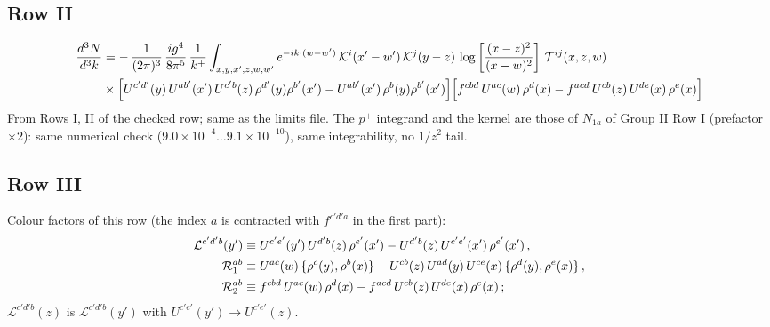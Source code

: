 \documentclass[9pt]{article}
\numberwithin{equation}{section}
\begin{document}
\subsection{Row II}
\begin{align}
     \frac{d^{3}N}{d^{3}k}  & =  -\,\frac{1}{(2\pi)^{3}}\,\frac{ig^{4}}{8\pi^{5}}\,\frac{1}{k^{+}} \int_{x,y,x',z,w,w^{\prime}} e^{-ik\cdot(w-w^{\prime})}\,\mathcal{K}^{i}(x'-w')\,\mathcal{K}^{j}(y-z)\,\log\left[\frac{(x-z)^{2}}{(x-w)^{2}}\right]\,\mathcal{T}^{ij}(x,z,w)\notag \\
& \times \Big[U^{c'd'}(y)\,U^{ab'}(x')\,U^{c'b}(z)\,\rho^{d'}(y)\rho^{b'}(x')-U^{ab'}(x')\,\rho^{b}(y)\rho^{b'}(x')\Big]\Big[f^{cbd}\,U^{ac}(w)\,\rho^{d}(x)-f^{acd}\, U^{cb}(z)\,U^{de}(x)\,\rho^{e}(x)\Big]
\end{align}
{\color{gray}\small From Rows I, II of the checked row; same as the limits file. The $p^{+}$ integrand and the kernel are those of $N_{1a}$ of Group II Row I (prefactor $\times2$): same numerical check ($9.0\times10^{-4}\dots9.1\times10^{-10}$), same integrability, no $1/z^{2}$ tail.}
\subsection{Row III}
\noindent Colour factors of this row (the index $a$ is contracted with $f^{c'd'a}$ in the first part):
\begin{align}
\mathcal{L}^{c'd'b}(y') & \equiv U^{c'e'}(y')\,U^{d'b}(z)\,\rho^{e'}(x')-U^{d'b}(z)\,U^{c'e'}(x')\,\rho^{e'}(x')\,,\notag\\
\mathcal{R}_{1}^{ab} & \equiv U^{ac}(w)\, \{\rho^{c}(y),\rho^{b}(x)\}-U^{cb}(z)\,U^{ad}(y)\,U^{ce}(x)\,\{\rho^{d}(y),\rho^{e}(x)\}\,,\notag\\
\mathcal{R}_{2}^{ab} & \equiv f^{cbd}\,U^{ac}(w)\,\rho^{d}(x) -f^{acd}\,U^{cb}(z)\,U^{de}(x)\,\rho^{e}(x)\,;\notag
\end{align}
$\mathcal{L}^{c'd'b}(z)$ is $\mathcal{L}^{c'd'b}(y')$ with $U^{c'e'}(y')\to U^{c'e'}(z)$.
\end{document}
